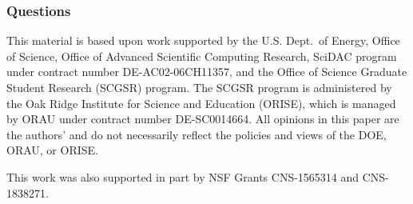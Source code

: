 \documentclass[aspectratio=169]{beamer}
\begin{document}
\begin{frame}
  \frametitle{Questions}
  \tableofcontents
  \bigskip
{\tiny
This material is based upon work supported by the U.S. Dept.\ of Energy,
Office of Science, Office of Advanced Scientific Computing Research, SciDAC
program under contract number DE-AC02-06CH11357, and the Office of Science
Graduate Student Research (SCGSR) program.
The SCGSR program is administered by the Oak Ridge Institute for
Science and Education (ORISE), which is managed by ORAU under contract number
DE-SC0014664.
All opinions in this paper are the authors' and do not
necessarily reflect the policies and views of the DOE, ORAU, or ORISE.

This work was also supported in part by NSF Grants CNS-1565314 and CNS-1838271.
}
\end{frame}
\end{document}
